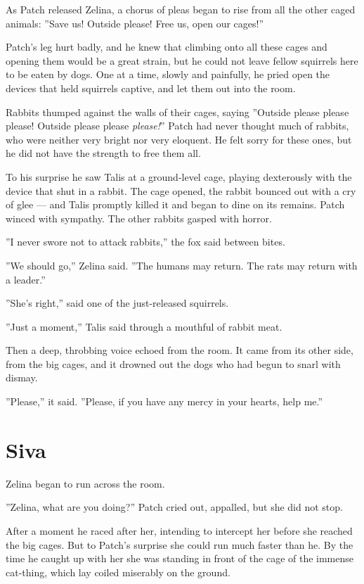 \documentclass[12pt]{book}
\begin{document}
As Patch released Zelina, a chorus of pleas began to rise from all the other caged animals: ''Save us! Outside please! Free us, open our cages!''

Patch's leg hurt badly, and he knew that climbing onto all these cages and opening them would be a great strain, but he could not leave fellow squirrels here to be eaten by dogs. One at a time, slowly and painfully, he pried open the devices that held squirrels captive, and let them out into the room.

Rabbits thumped against the walls of their cages, saying ''Outside please please please! Outside please please {\it please!}'' Patch had never thought much of rabbits, who were neither very bright nor very eloquent. He felt sorry for these ones, but he did not have the strength to free them all.

To his surprise he saw Talis at a ground-level cage, playing dexterously with the device that shut in a rabbit. The cage opened, the rabbit bounced out with a cry of glee ---
and Talis promptly killed it and began to dine on its remains. Patch winced with sympathy. The other rabbits gasped with horror.

''I never swore not to attack rabbits,'' the fox said between bites.

''We should go,'' Zelina said. ''The humans may return. The rats may return with a leader.''

''She's right,'' said one of the just-released squirrels.

''Just a moment,'' Talis said through a mouthful of rabbit meat.

Then a deep, throbbing voice echoed from the room. It came from its other side, from the big cages, and it drowned out the dogs who had begun to snarl with dismay.

''Please,'' it said. ''Please, if you have any mercy in your hearts, help me.''


\section{Siva}

Zelina began to run across the room.

''Zelina, what are you doing?'' Patch cried out, appalled, but she did not stop.

After a moment he raced after her, intending to intercept her before she reached the big cages. But to Patch's surprise she could run much faster than he. By the time he caught up with her she was standing in front of the cage of the immense cat-thing, which lay coiled miserably on the ground.
\end{document}
